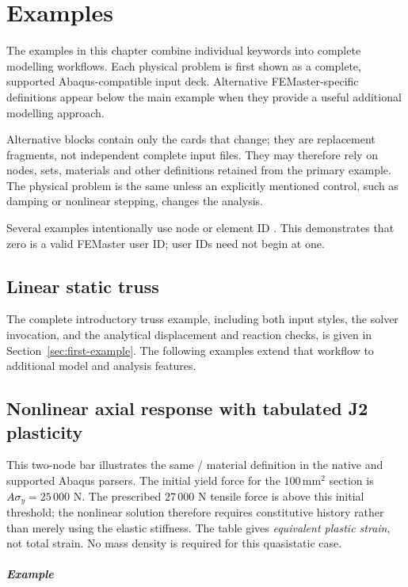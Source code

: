 \chapter{Examples}
\label{chap:complete-examples}

The examples in this chapter combine individual keywords into
complete modelling workflows. Each physical problem is first shown
as a complete, supported Abaqus-compatible input deck. Alternative
FEMaster-specific definitions appear below the main example when
they provide a useful additional modelling approach.

Alternative blocks contain only the cards that change; they are
replacement fragments, not independent complete input files.
They may therefore rely on nodes, sets, materials and other
definitions retained from the primary example. The physical
problem is the same unless an explicitly mentioned control,
such as damping or nonlinear stepping, changes the analysis.

Several examples intentionally use node or element ID . This demonstrates that zero is a valid FEMaster user ID; user IDs need not begin at one.

\section{Linear static truss}

The complete introductory truss example, including both input styles, the solver invocation, and the analytical displacement and reaction checks, is given in Section~\ref{sec:first-example}. The following examples extend that workflow to additional model and analysis features.

\section{Nonlinear axial response with tabulated J2 plasticity}

This two-node bar illustrates the same / material definition in the native and supported Abaqus parsers. The initial yield force for the 100\,mm\(^2\) section is \(A\sigma_y=25\,000\) N. The prescribed 27\,000 N tensile force is above this initial threshold; the nonlinear solution therefore requires constitutive history rather than merely using the elastic stiffness. The table gives \emph{equivalent plastic strain}, not total strain. No mass density is required for this quasistatic case.

\paragraph*{Example}

